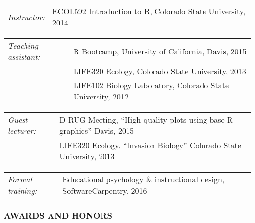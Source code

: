 \documentclass[11pt,english]{article}
\providecommand{\tabularnewline}{\\}
\begin{document}
\begin{hangparas}{.25in}{1}

\begin{tabular}{>{\raggedright}p{1.26in}>{\raggedright}p{4.75in}}
\emph{Instructor:} & ECOL592 Introduction to R, Colorado State University, 2014
\end{tabular}

\begin{tabular}{>{\raggedright}p{1.26in}>{\raggedright}p{4.75in}}
\emph{Teaching assistant:} & R Bootcamp, University of California, Davis, 2015 \tabularnewline
& LIFE320 Ecology, Colorado State University, 2013 \tabularnewline 
& LIFE102 Biology Laboratory, Colorado State University, 2012 \tabularnewline
\end{tabular}

\begin{tabular}{>{\raggedright}p{1.26in}>{\raggedright}p{4.75in}}
\emph{Guest lecturer:} & D-RUG Meeting, ``High quality plots using base R graphics'' Davis, 2015 \tabularnewline
& LIFE320 Ecology, ``Invasion Biology'' Colorado State University, 2013
\end{tabular}

\begin{tabular}{>{\raggedright}p{1.26in}>{\raggedright}p{4.75in}}
\emph{Formal training:} & Educational psychology \& instructional design, SoftwareCarpentry, 2016
\end{tabular}

\end{hangparas}
\vspace{1ex}



\subsubsection*{AWARDS AND HONORS}
\vspace{-0.5ex}

\end{document}
